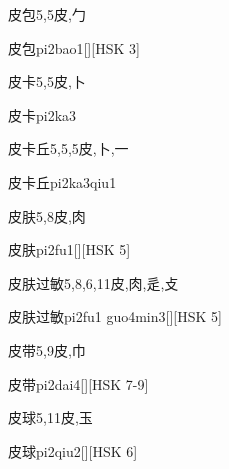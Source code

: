 \begin{Entry}{皮包}{5,5}{⽪,⼓}
  \begin{Phonetics}{皮包}{pi2bao1}[][HSK 3]
  \end{Phonetics}
\end{Entry}

\begin{Entry}{皮卡}{5,5}{⽪,⼘}
  \begin{Phonetics}{皮卡}{pi2ka3}
  \end{Phonetics}
\end{Entry}

\begin{Entry}{皮卡丘}{5,5,5}{⽪,⼘,⼀}
  \begin{Phonetics}{皮卡丘}{pi2ka3qiu1}
  \end{Phonetics}
\end{Entry}

\begin{Entry}{皮肤}{5,8}{⽪,⾁}
  \begin{Phonetics}{皮肤}{pi2fu1}[][HSK 5]
  \end{Phonetics}
\end{Entry}

\begin{Entry}{皮肤过敏}{5,8,6,11}{⽪,⾁,⾡,⽁}
  \begin{Phonetics}{皮肤过敏}{pi2fu1 guo4min3}[][HSK 5]
  \end{Phonetics}
\end{Entry}

\begin{Entry}{皮带}{5,9}{⽪,⼱}
  \begin{Phonetics}{皮带}{pi2dai4}[][HSK 7-9]
  \end{Phonetics}
\end{Entry}

\begin{Entry}{皮球}{5,11}{⽪,⽟}
  \begin{Phonetics}{皮球}{pi2qiu2}[][HSK 6]
  \end{Phonetics}
\end{Entry}

